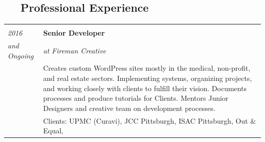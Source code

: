 \documentclass[]{article}
\def\briefcase{{\FA \faBriefcase}}
\begin{document}
\begin{multicols}{2}

\subsection{\texorpdfstring{\color{blue} \briefcase ~~ Professional
Experience}{ ~~ Professional Experience}}\label{professional-experience}

\begin{longtable}[c]{@{}ll@{}}
\toprule
\begin{minipage}[t]{0.20\columnwidth}\raggedright\strut
\strut\end{minipage} &
\begin{minipage}[t]{0.74\columnwidth}\raggedright\strut
\strut\end{minipage}\tabularnewline
\begin{minipage}[t]{0.20\columnwidth}\raggedright\strut
\color{grey} \emph{2016}
\strut\end{minipage} &
\begin{minipage}[t]{0.74\columnwidth}\raggedright\strut
\textbf{Senior Developer}
\strut\end{minipage}\tabularnewline
\begin{minipage}[t]{0.20\columnwidth}\raggedright\strut
\color{grey} \emph{and Ongoing}
\strut\end{minipage} &
\begin{minipage}[t]{0.74\columnwidth}\raggedright\strut
\emph{at Fireman Creative}
\strut\end{minipage}\tabularnewline
\begin{minipage}[t]{0.20\columnwidth}\raggedright\strut
\strut\end{minipage} &
\begin{minipage}[t]{0.74\columnwidth}\raggedright\strut
\color{grey} Creates custom WordPress sites mostly in the medical,
non-profit, and real estate sectors. Implementing systems, organizing
projects, and working closely with clients to fulfill their vision.
Documents processes and produce tutorials for Clients. Mentors Junior
Designers and creative team on development processes.
\strut\end{minipage}\tabularnewline
\begin{minipage}[t]{0.20\columnwidth}\raggedright\strut
\strut\end{minipage} &
\begin{minipage}[t]{0.74\columnwidth}\raggedright\strut
Clients: UPMC (Curavi), JCC Pittsburgh, ISAC Pittsburgh, Out \& Equal,

\end{minipage}
\end{longtable}
\end{multicols}
\end{document}
